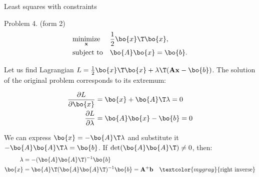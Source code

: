 \documentclass{beamer}
\begin{document}
\begin{frame}{Least squares with constraints}
	\begin{flushleft}
		
		
		Problem 4. (form 2)
		\begin{equation}
			\begin{aligned}
				& \underset{\mathbf{x}}{\text{minimize}}
				& & \frac{1}{2} \bo{x}\T \bo{x}, \\
				& \text{subject to}
				& & \bo{A} \bo{x} = \bo{b}.
			\end{aligned}
		\end{equation}
		
		Let us find Lagrangian $L =\frac{1}{2} \bo{x}\T \bo{x} + \lambda\T ( \mathbf{A} \mathbf{x} - \bo{b})$. The  solution of the original problem corresponds to its extremum:
		
		\begin{align}
			\frac{\partial L}{\partial \bo{x}} &=  \bo{x} + \bo{A}\T  \lambda = 0 
			\\
			\frac{\partial L}{\partial \lambda} &=  \bo{A} \bo{x}- \bo{b} = 0
		\end{align}
		
		We can express $\bo{x} = -\bo{A}\T  \lambda$ and substitute it $-\bo{A} \bo{A}\T  \lambda= \bo{b}$. If $\text{det}(\bo{A} \bo{A}\T ) \neq 0$, then:
		\begin{align}
			 \lambda &= - (\bo{A} \bo{A}\T )^{-1} \bo{b}
			 \\
			 \bo{x} &= \bo{A}\T  (\bo{A} \bo{A}\T )^{-1} \bo{b} =  \mathbf{A}^+\mathbf{b} \ \ \ \textcolor{mygray}{\text{right inverse}}
		\end{align}		
		
	\end{flushleft}
\end{frame}
\end{document}
